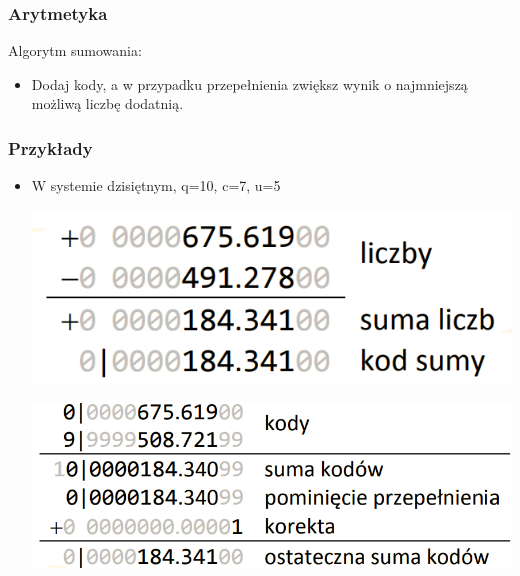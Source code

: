 \documentclass[12pt]{article}
\begin{document}
    \subsubsection{Arytmetyka}
    Algorytm sumowania:
    \begin{itemize}
        \item Dodaj kody, a w przypadku przepełnienia zwiększ wynik o najmniejszą możliwą liczbę dodatnią.
    \end{itemize}

    \subsubsection{Przykłady}
    \begin{itemize}
        \item W systemie dzisiętnym, q=10, c=7, u=5
        \begin{center}
            \includegraphics[scale=0.4]{graphics/number-repr/odw-add-dec.png}
        \end{center}
        \begin{center}
            \includegraphics[scale=0.4]{graphics/number-repr/odw-add-dec-2.png}
        \end{center}



\end{itemize}
\end{document}
